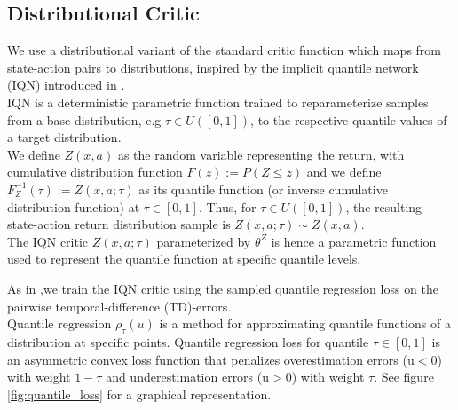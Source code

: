 \subsection{Distributional Critic}
We use a distributional variant of the standard critic function
which maps from state-action pairs to distributions, inspired by the implicit quantile network (IQN) introduced in \cite{Dabney2018b}.\\
IQN is a deterministic parametric function trained to reparameterize samples from a
base distribution, e.g $\tau \in U([0,1])$, to the respective
quantile values of a target distribution.\\
We define $Z(x,a)$ as the random variable representing the return, with cumulative 
distribution function $F(z):=P(Z\leq z)$ and we define $F^{-1}_Z(\tau):=Z(x,a;\tau)$ as its quantile function 
(or inverse cumulative distribution function)
at $\tau \in [0,1]$.
Thus, for $\tau \in U([0,1])$, the resulting state-action return distribution sample is
$Z(x,a;\tau)\sim Z(x,a)$.\\
The IQN critic $Z(x,a;\tau)$ parameterized by $\theta^Z$  is hence a parametric function
used to represent the quantile function at specific quantile levels.

As in \citet{Dabney2018b},we train the IQN critic using the sampled quantile regression
loss \citep{koenker2005} on the pairwise temporal-difference (TD)-errors.\\
Quantile regression $\rho_{\tau}(u)$ is a method for approximating quantile functions of a distribution at specific points.
Quantile regression loss for quantile $\tau \in [0,1]$ is an asymmetric convex loss function
that penalizes overestimation errors (u$<$0) with weight $1-\tau$ and underestimation
errors (u$>$0) with weight $\tau$. See figure \ref{fig:quantile_loss} for a graphical representation. 

